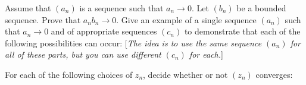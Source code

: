 \documentclass[answers]{exam}
\begin{document}
\begin{questions}
\question%
Assume that $(a_{n})$ is a sequence such that $a_{n} \to 0$. Let $(b_{n})$ be a bounded sequence. Prove that $a_{n} b_{n} \to 0$. Give an example of a single sequence $(a_{n})$ such that $a_{n} \to 0$ and of appropriate sequences $(c_{n})$ to demonstrate that each of the following possibilities can occur:
[\emph{The idea is to use the same sequence $(a_{n})$ for all of these parts, but you can use different $(c_{n})$ for each.}]



\question%
For each of the following choices of $z_{n}$, decide whether or not $\left(z_{n}\right)$ converges:




\end{questions}
\end{document}
